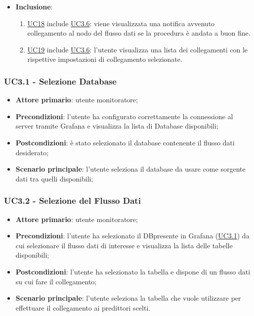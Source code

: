 \begin{itemize}
\begin{enumerate}
				\end{enumerate}
			\item\textbf{Inclusione}:
				\begin{enumerate}
					\item\hyperref[par:UC18]{UC18} include \hyperref[par:UC3.6]{UC3.6}: viene visualizzata una notifica avvenuto collegamento al nodo del flusso dati se la procedura è andata a buon fine.
					\item\hyperref[par:UC19]{UC19} include \hyperref[par:UC3.6]{UC3.6}:  l'utente visualizza una lista dei collegamenti con le rispettive impostazioni di collegamento selezionate.
				\end{enumerate}
		\end{itemize}
		
		\label{par:UC3.1}
		\subsubsection{UC3.1 - Selezione Database}
		\begin{itemize}
			\item\textbf{Attore primario}: utente monitoratore;
			\item\textbf{Precondizioni}: l’utente ha configurato correttamente la connessione al server tramite Grafana e visualizza la lista di Database disponibili;
			\item\textbf{Postcondizioni}: è stato selezionato il database contenente il flusso dati desiderato;
			\item\textbf{Scenario principale}: l’utente seleziona il database da usare come sorgente dati tra quelli disponibili;
		\end{itemize}
		
		\label{par:UC3.2}
		\subsubsection{UC3.2 - Selezione del Flusso Dati}
		\begin{itemize}
			\item\textbf{Attore primario}: utente monitoratore;
			\item\textbf{Precondizioni}: l’utente ha selezionato il DB\glo presente in Grafana (\hyperref[par:UC3.1]{UC3.1}) da cui selezionare il flusso dati di interesse e visualizza la lista delle tabelle disponibili;
			\item\textbf{Postcondizioni}: l’utente ha selezionato la tabella e dispone di un flusso dati su cui fare il collegamento;
			\item\textbf{Scenario principale}: l’utente seleziona la tabella che vuole utilizzare per effettuare il collegamento ai predittori scelti.
		\end{itemize}
		
